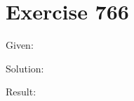 \documentclass[a4paper, 10pt]{scrartcl}
\begin{document}
\section{Exercise 766}

Given:
\[\]

Solution:

Result:
\end{document}

